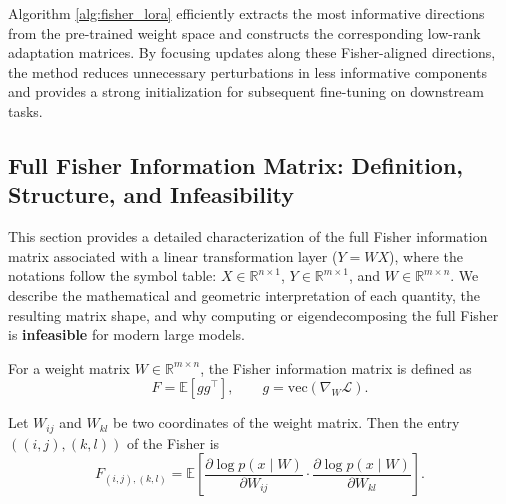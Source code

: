 \documentclass{article}
\theoremstyle{plain}
\theoremstyle{definition}
\theoremstyle{remark}
\begin{document}
Algorithm \ref{alg:fisher_lora} efficiently extracts the most informative directions from the pre-trained weight space and constructs the corresponding low-rank adaptation matrices. By focusing updates along these Fisher-aligned directions, the method reduces unnecessary perturbations in less informative components and provides a strong initialization for subsequent fine-tuning on downstream tasks.



\subsection{Full Fisher Information Matrix: Definition, Structure, and Infeasibility}
\label{appendix_subsection:full_fisher_infeasibility}
This section provides a detailed characterization of the full Fisher information matrix associated with a linear transformation layer ($Y = W X$), where the notations follow the symbol table: $X \in \mathbb{R}^{n \times 1}$, $Y \in \mathbb{R}^{m \times 1}$, and $W \in \mathbb{R}^{m \times n}$. We describe the mathematical and geometric interpretation of each quantity, the resulting matrix shape, and why computing or eigendecomposing the full Fisher is \textbf{infeasible} for modern large models.

For a weight matrix $W \in \mathbb{R}^{m \times n}$, the Fisher information matrix is defined as
\begin{equation}
F = \mathbb{E}\left[ g g^\top \right], \qquad g = \mathrm{vec}\left(\nabla_{W} \mathcal{L}\right).
\label{eq:fisher_def}
\end{equation}


Let $W_{ij}$ and $W_{kl}$ be two coordinates of the weight matrix. Then the entry $((i,j),(k,l))$ of the Fisher is
\begin{equation}
F_{(i,j),(k,l)} = \mathbb{E} \left[ \frac{\partial \log p(x\mid W)}{\partial W_{ij}} \cdot \frac{\partial \log p(x\mid W)}{\partial W_{kl}} \right].
\end{equation}
\end{document}
